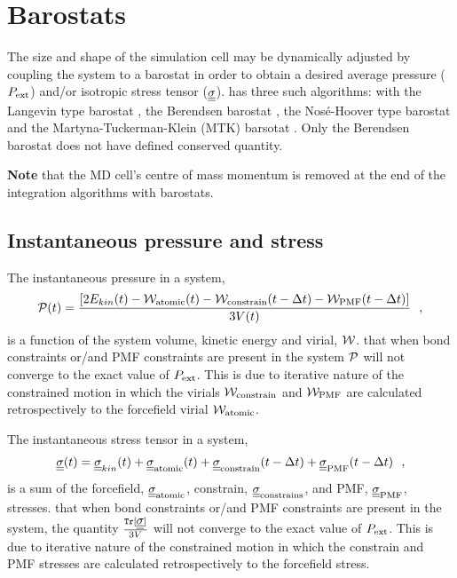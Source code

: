 \section{Barostats}

The size and shape of the simulation cell may be dynamically
adjusted by coupling the system to a barostat in order to obtain a
desired average pressure ($P_{\rm ext}$) and/or isotropic stress
tensor ($\mbox{$\underline{\underline{\bf \sigma}}$}$).  \D has three such
algorithms: with the Langevin type barostat \cite{quigley-04},
the Berendsen barostat \cite{berendsen-84a}, the
Nos\'{e}-Hoover type barostat \cite{hoover-85a} and the
Martyna-Tuckerman-Klein (MTK) barsotat \cite{martyna-96a}.  Only
the Berendsen barostat does not have defined conserved quantity.

{\bf Note} that the MD cell's centre of mass momentum is removed
at the end of the integration algorithms with barostats.

\subsection{Instantaneous pressure and stress}

The instantaneous pressure in a system,
\begin{equation}
{\cal P}(t) = \frac{\left[ 2 E_{kin}(t) - {\cal W}_{\rm atomic}(t) -
{\cal W}_{\rm constrain}(t - \Delta t) -
{\cal W}_{\rm PMF}(t - \Delta t) \right]} {3 V(t)}~~,
\end{equation}
is a function of the system volume, kinetic energy and virial, ${\cal W}$.
 that when bond constraints or/and PMF constraints
are present in the system ${\cal P}$ will not converge to the exact
value of $P_{\rm ext}$.  This is due to iterative nature of the
constrained motion in which the virials ${\cal W}_{\rm constrain}$
and ${\cal W}_{\rm PMF}$ are calculated retrospectively to the
forcefield virial ${\cal W}_{\rm atomic}$.

The instantaneous stress tensor in a system,
\begin{equation}
\mbox{$\underline{\underline{\bf \sigma}}$}(t) = \mbox{$\underline{\underline{\bf \sigma}}$}_{kin}(t) + \mbox{$\underline{\underline{\bf \sigma}}$}_{\rm atomic}(t) +
\mbox{$\underline{\underline{\bf \sigma}}$}_{\rm constrain}(t - \Delta t) + \mbox{$\underline{\underline{\bf \sigma}}$}_{\rm PMF}(t - \Delta t)~~,
\end{equation}
is a sum of the forcefield, $\mbox{$\underline{\underline{\bf \sigma}}$}_{\rm atomic}$, constrain,
$\mbox{$\underline{\underline{\bf \sigma}}$}_{\rm constrains}$, and PMF, $\mbox{$\underline{\underline{\bf \sigma}}$}_{\rm PMF}$, stresses.
 that when bond constraints or/and PMF constraints are
present in the system, the quantity $\frac{{\tt Tr}[\mbox{$\underline{\underline{\bf \sigma}}$}]}{3 V}$
will not converge to the exact value of $P_{\rm ext}$.  This is due to
iterative nature of the constrained motion in which the constrain and PMF
stresses are calculated retrospectively to the forcefield stress.

